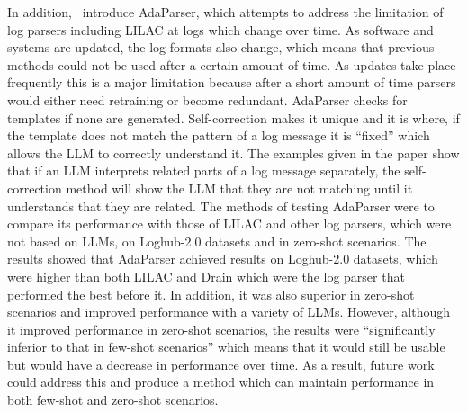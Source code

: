 In addition,~\cite{wu2024log} introduce AdaParser, which attempts to address the limitation of log parsers including LILAC at logs which change over time. As software and systems are updated, the log formats also change, which means that previous methods could not be used after a certain amount of time. As updates take place frequently this is a major limitation because after a short amount of time parsers would either need retraining or become redundant. AdaParser checks for templates if none are generated. Self-correction makes it unique and it is where, if the template does not match the pattern of a log message it is ``fixed'' which allows the LLM to correctly understand it. The examples given in the paper show that if an LLM interprets related parts of a log message separately, the self-correction method will show the LLM that they are not matching until it understands that they are related. The methods of testing AdaParser were to compare its performance with those of LILAC and other log parsers, which were not based on LLMs, on Loghub-2.0 datasets and in zero-shot scenarios. The results showed that AdaParser achieved results on Loghub-2.0 datasets, which were higher than both LILAC and Drain which were the log parser that performed the best before it. In addition, it was also superior in zero-shot scenarios and improved performance with a variety of LLMs. However, although it improved performance in zero-shot scenarios, the results were ``significantly inferior to that in few-shot scenarios'' which means that it would still be usable but would have a decrease in performance over time. As a result, future work could address this and produce a method which can maintain performance in both few-shot and zero-shot scenarios. 

